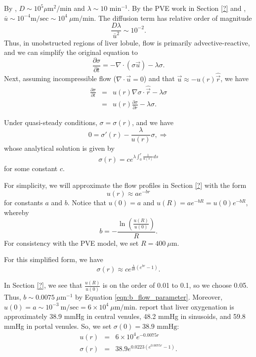 \documentclass[smallextended,natbib,draft]{svjour3}
\newcommand{\beqa}{\begin{eqnarray}}
\newcommand{\beq}{\begin{equation}}
\newcommand{\eeqa}{\end{eqnarray}}
\newcommand{\eeq}{\end{equation}}
\newcommand{\micron}{\mu\textrm{m}}
\newcommand{\hatvec}[1]{\hat{\vec{#1}}}
\begin{document}
By \citep{biofvm}, 
$D \sim 10^5 \micron^2 / \textrm{min}$ and 
$\lambda \sim 10 \textrm{ min}^{-1}$. 
By the PVE work in Section \ref{?} and \citet{nishii}, 
$\bar{u} \sim 10^{-4} \textrm{m}/\textrm{sec} 
\sim 10^4 \:\micron/\textrm{min}$.  
The diffusion term has relative order of magnitude 
\beq
\frac{ D \lambda }{ \bar{u}^2}  \sim 10^{-2}. 
\eeq
Thus, in unobstructed regions of liver lobule, flow is primarily advective-reactive, and we can simplify the original equation  to 
\beq
\frac{ \partial \sigma }{ \partial t} = -\nabla \cdot \left( \sigma \vec{u} \right) - \lambda \sigma. 
\eeq
Next, assuming incompressible flow ($\nabla \cdot \vec{u} = 0$) and 
that $\vec{u} \approx - u(r) \hatvec{r}$, we have 
\beqa
\frac{\partial \sigma}{\partial t} & =& 
u(r) \nabla \sigma \cdot \hatvec{r} - \lambda \sigma \\
 & = & 
u(r) \frac{ \partial \sigma}{\partial r} - \lambda \sigma.  
\eeqa

Under quasi-steady conditions, $\sigma =\sigma(r)$, and we have 
\beq
0 = \sigma'(r) - \frac{ \lambda }{ u(r) } \sigma , 
\Longrightarrow 
\eeq
whose analytical solution is given by 
\beq
\sigma(r) = c e^{ \lambda \int_0^r \frac{1}{u(s)} ds }
\eeq
for some constant $c$.  

For simplicity, we will approximate the flow profiles in 
Section \ref{?} with the form 
\beq
u(r) \approx a e^{-b r} 
\eeq
for constants $a$ and $b$. 
Notice that $u(0) = a$ and $u(R) = a e^{-bR} = u(0) e^{-bR}$, whereby 
\beq
b = - \frac{ \ln \left( \frac{u(R)}{u(0)} \right) }{R} . 
\label{eqn:b_flow_parameter}
\eeq
For consistency with the PVE model, we set $R = 400\:\micron$. 

For this simplified form, we have 
\beq
\sigma(r) \approx  c e^{ \frac{ \lambda }{ ab} \left( e^{br} - 1 \right) }. 
\eeq

In Section \ref{?}, we see that $\frac{ u(R) }{ u(0) }$ is on the order of 0.01 to 0.1, so 
we choose 0.05. Thus, $b \sim 0.0075 \: \micron^{-1}$ by Equation \ref{eqn:b_flow_parameter}. 
Moreover, $u(0) = a \sim 10^{-3} \: \mathrm{m/sec} = 6 \times 10^4 \: \micron/\mathrm{min}$.  
\citet{tsukada} report that liver oxygenation is approximately 38.9 mmHg in central venules, 48.2 mmHg in sinusoids, 
and 59.8 mmHg in portal venules. So, we set $\sigma(0) = 38.9 \textrm{ mmHg}$: 
\beqa
u(r) & = & 6 \times 10^4 e^{ -0.0075 r} \\
\sigma(r) & = & 38.9 e^{ 0.0223 \left( e^{0.0075 r } - 1 \right)  }. 
\label{eqn:analytical_oxygen}
\eeqa
\end{document}
